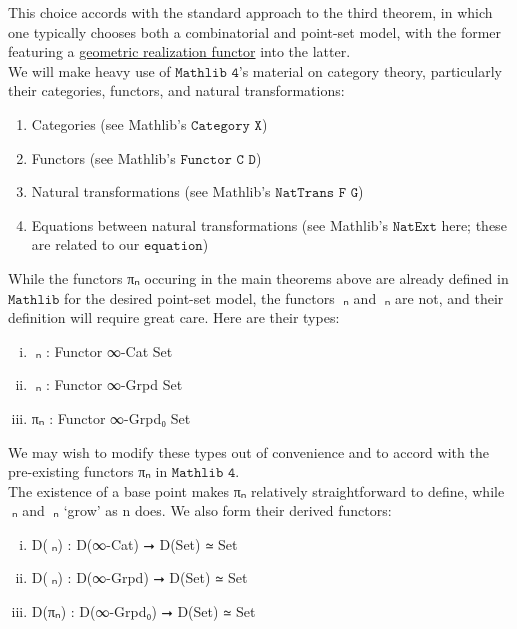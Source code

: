 \documentclass{book}
\theoremstyle{definition}
\begin{document}
This choice accords with the standard approach to the third theorem, in which one typically chooses both a combinatorial and point-set model, with the former featuring a \href{https://github.com/leanprover-community/mathlib4/blob/8666bd82efec40b8b3a5abca02dc9b24bbdf2652/Mathlib/AlgebraicTopology/SimplicialSet.lean#L235-L236}{geometric realization functor} into the latter.\\

We will make heavy use of $\texttt{Mathlib 4}$'s material on category theory, particularly their categories, functors, and natural transformations:

\begin{enumerate}
\item Categories (see Mathlib's $\texttt{Category X}$)
\item Functors (see Mathlib's $\texttt{Functor C D}$)
\item Natural transformations (see Mathlib's $\texttt{NatTrans F G}$)
\item Equations between natural transformations (see Mathlib's $\texttt{NatExt}$ here; these are related to our $\texttt{equation}$)
\end{enumerate}

While the functors πₙ occuring in the main theorems above are already defined in $\texttt{Mathlib}$ for the desired point-set model, the functors π⃗ₙ and π⃡ₙ are not, and their definition will require great care. Here are their types:

\begin{enumerate}[(i)]
\item π⃗ₙ : Functor ∞-Cat Set
\item π⃡ₙ : Functor ∞-Grpd Set
\item πₙ : Functor ∞-Grpd₀ Set
\end{enumerate}

We may wish to modify these types out of convenience and to accord with the pre-existing functors πₙ in $\texttt{Mathlib 4}$.\\

The existence of a base point makes πₙ relatively straightforward to define, while π⃗ₙ and π⃡ₙ `grow' as n does. We also form their derived functors:

\begin{enumerate}[(i)]
\item D(π⃗ₙ) : D(∞-Cat) ⭢ D(Set) ≃ Set
\item D(π⃡ₙ) : D(∞-Grpd) ⭢ D(Set) ≃ Set
\item D(πₙ) : D(∞-Grpd₀) ⭢ D(Set) ≃ Set
\end{enumerate}
\end{document}
